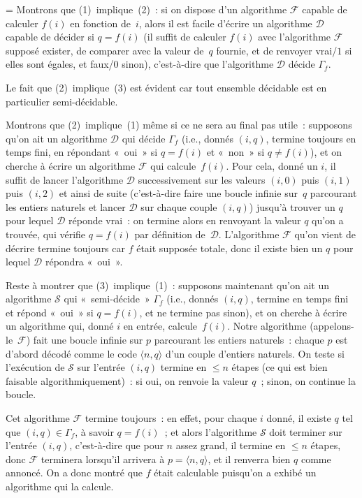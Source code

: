 \documentclass[12pt,a4paper]{article}
\theoremstyle{definition}
\newif\ifcorrige
\newenvironment{corrige}%
{\ifcorrige\relax\else\setbox0=\vbox\bgroup\fi%
\smallbreak\footnotesize\noindent{\underbar{\textit{Corrigé.}}\quad}}
{{\hbox{}\nobreak\hfill\checkmark}%
\ifcorrige\relax\else\egroup\fi\par}
\begin{document}
\begin{corrige}
Montrons que (1) implique (2) : si on dispose d'un algorithme
$\mathscr{F}$ capable de calculer $f(i)$ en fonction de $i$, alors il
est facile d'écrire un algorithme $\mathscr{D}$ capable de décider si
$q=f(i)$ (il suffit de calculer $f(i)$ avec l'algorithme $\mathscr{F}$
supposé exister, de comparer avec la valeur de $q$ fournie, et de
renvoyer vrai/$1$ si elles sont égales, et faux/$0$ sinon),
c'est-à-dire que l'algorithme $\mathscr{D}$ décide $\Gamma_f$.

Le fait que (2) implique (3) est évident car tout ensemble décidable
est en particulier semi-décidable.

Montrons que (2) implique (1) même si ce ne sera au final pas utile :
supposons qu'on ait un algorithme $\mathscr{D}$ qui décide $\Gamma_f$
(i.e., donnés $(i,q)$, termine toujours en temps fini, en répondant
« oui » si $q=f(i)$ et « non » si $q\neq f(i)$), et on cherche à
écrire un algorithme $\mathscr{F}$ qui calcule $f(i)$.  Pour cela,
donné un $i$, il suffit de lancer l'algorithme $\mathscr{D}$
successivement sur les valeurs $(i,0)$ puis $(i,1)$ puis $(i,2)$ et
ainsi de suite (c'est-à-dire faire une boucle infinie sur $q$
parcourant les entiers naturels et lancer $\mathscr{D}$ sur chaque
couple $(i,q)$) jusqu'à trouver un $q$ pour lequel $\mathscr{D}$
réponde vrai : on termine alors en renvoyant la valeur $q$ qu'on a
trouvée, qui vérifie $q=f(i)$ par définition de $\mathscr{D}$.
L'algorithme $\mathscr{F}$ qu'on vient de décrire termine toujours car
$f$ était supposée totale, donc il existe bien un $q$ pour lequel
$\mathscr{D}$ répondra « oui ».

Reste à montrer que (3) implique (1) : supposons maintenant qu'on ait
un algorithme $\mathscr{S}$ qui « semi-décide » $\Gamma_f$ (i.e.,
donnés $(i,q)$, termine en temps fini et répond « oui » si $q=f(i)$,
et ne termine pas sinon), et on cherche à écrire un algorithme qui,
donné $i$ en entrée, calcule $f(i)$.  Notre algorithme
(appelons-le $\mathscr{F}$) fait une boucle infinie sur $p$ parcourant
les entiers naturels : chaque $p$ est d'abord décodé comme le code
$\langle n,q\rangle$ d'un couple d'entiers naturels.  On teste si
l'exécution de $\mathscr{S}$ sur l'entrée $(i,q)$ termine en $\leq n$
étapes (ce qui est bien faisable algorithmiquement) : si oui, on
renvoie la valeur $q$ ; sinon, on continue la boucle.

Cet algorithme $\mathscr{F}$ termine toujours : en effet, pour chaque
$i$ donné, il existe $q$ tel que $(i,q) \in \Gamma_f$, à savoir $q =
f(i)$ ; et alors l'algorithme $\mathscr{S}$ doit terminer sur l'entrée
$(i,q)$, c'est-à-dire que pour $n$ assez grand, il termine en $\leq n$
étapes, donc $\mathscr{F}$ terminera lorsqu'il arrivera à $p = \langle
n,q\rangle$, et il renverra bien $q$ comme annoncé.  On a donc montré
que $f$ était calculable puisqu'on a exhibé un algorithme qui la
calcule.


\end{corrige}
\end{document}
